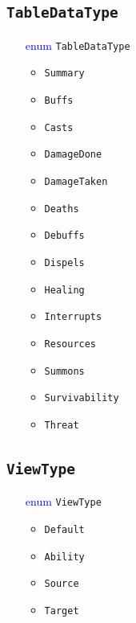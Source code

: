 \documentclass[10pt, a4paper]{memoir}
\numberwithin{equation}{section}
\theoremstyle{plain}
\theoremstyle{defp}
\theoremstyle{dotless}
\theoremstyle{definition}
\theoremstyle{dotless}
\theoremstyle{dotless}
\theoremstyle{defp}
\theoremstyle{defp}
\theoremstyle{be}          %
\theoremstyle{defp}
\newcommand\ttt[1]{\texttt{#1}}
\begin{document}
\subsection{\ttt{TableDataType}}\label{sec:TableDataType}
\begin{itemize}[noitemsep,topsep=1pt]
\item[\textcolor{blue}{enum}] \ttt{TableDataType}
\begin{itemize}[itemsep=1pt,topsep=1pt]
\item \ttt{Summary}
\item \ttt{Buffs}
\item \ttt{Casts}
\item \ttt{DamageDone}
\item \ttt{DamageTaken}
\item \ttt{Deaths}
\item \ttt{Debuffs}
\item \ttt{Dispels}
\item \ttt{Healing}
\item \ttt{Interrupts}
\item \ttt{Resources}
\item \ttt{Summons}
\item \ttt{Survivability}
\item \ttt{Threat}
\end{itemize}
\end{itemize}


\subsection{\ttt{ViewType}}\label{sec:ViewType}
\begin{itemize}[noitemsep,topsep=1pt]
\item[\textcolor{blue}{enum}] \ttt{ViewType}
\begin{itemize}[itemsep=1pt,topsep=1pt]
\item \ttt{Default}
\item \ttt{Ability}
\item \ttt{Source}
\item \ttt{Target}
\end{itemize}
\end{itemize}
\end{document}
